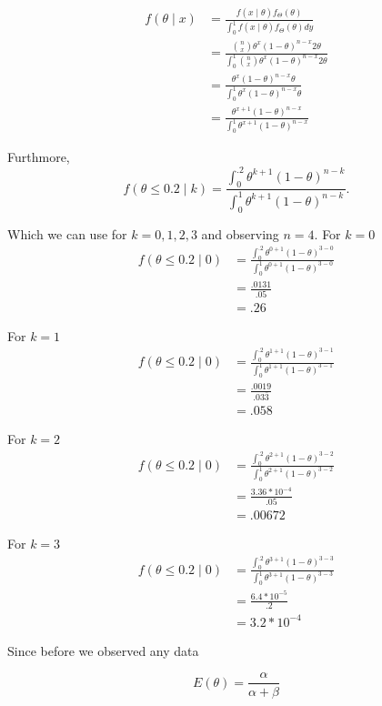 \documentclass{tufte-book}
\theoremstyle{mytheoremstyle}
\theoremstyle{mylemstyle}
\theoremstyle{mydefstyle}
\begin{document}
\begin{align*}
f(\theta \mid x) &= \frac{f(x \mid \theta) f_\Theta(\theta)}{\int_0^1 f(x \mid \theta) f_\Theta(\theta)dy}\\
&= \frac{\binom{n}{x}\theta^x(1-\theta)^{n-x} 2\theta}{\int_0^1 \binom{n}{x}\theta^x(1-\theta)^{n-x} 2\theta}\\
&= \frac{\theta^x(1-\theta)^{n-x} \theta}{\int_0^1 \theta^x(1-\theta)^{n-x} \theta}\\
&=\frac{\theta^{x+1}(1-\theta)^{n-x}}{\int_0^1 \theta^{x+1}(1-\theta)^{n-x}}
\end{align*}

Furthmore,
\[ f(\theta \leq 0.2 \mid k) = \frac{\int_0^{.2}\theta^{k+1}(1-\theta)^{n-k}}{\int_0^1 \theta^{k+1}(1-\theta)^{n-k}}. \]

Which we can use for $k=0,1,2,3$ and observing $n=4$.
For $k=0$
\begin{align*}
f(\theta \leq 0.2 \mid 0) &= \frac{\int_0^{.2}\theta^{0+1}(1-\theta)^{3-0}}{\int_0^1 \theta^{0+1}(1-\theta)^{3-0}}\\
&= \frac{.0131}{.05}\\
&= .26
\end{align*}

For $k=1$
\begin{align*}
f(\theta \leq 0.2 \mid 0) &= \frac{\int_0^{.2}\theta^{1+1}(1-\theta)^{3-1}}{\int_0^1 \theta^{1+1}(1-\theta)^{3-1}}\\
&= \frac{.0019}{.03\bar{3}}\\
&= .058
\end{align*}

For $k=2$
\begin{align*}
f(\theta \leq 0.2 \mid 0) &= \frac{\int_0^{.2}\theta^{2+1}(1-\theta)^{3-2}}{\int_0^1 \theta^{2+1}(1-\theta)^{3-2}}\\
&= \frac{3.36*10^{-4}}{.05}\\
&= .00672
\end{align*}

For $k=3$
\begin{align*}
f(\theta \leq 0.2 \mid 0) &= \frac{\int_0^{.2}\theta^{3+1}(1-\theta)^{3-3}}{\int_0^1 \theta^{3+1}(1-\theta)^{3-3}}\\
&= \frac{6.4*10^{-5}}{.2}\\
&= 3.2*10^{-4}
\end{align*}

Since before we observed any data

\[ E(\theta) = \frac{\alpha}{\alpha+\beta} \]
\end{document}
